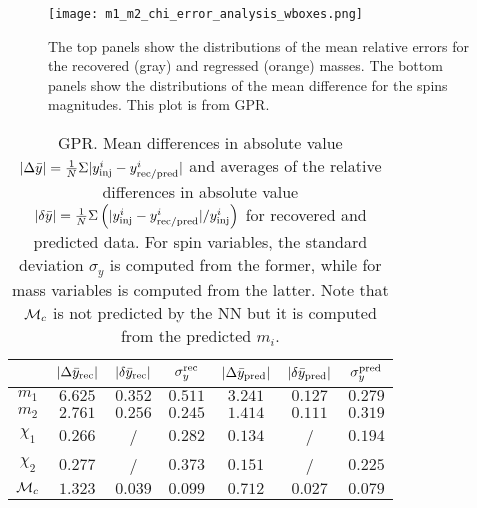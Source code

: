 \begin{figure}
    \centering
    \texttt{[image: m1\_m2\_chi\_error\_analysis\_wboxes.png]}
    \caption{The top panels show the distributions of the mean relative errors
            for the recovered (gray) and regressed (orange) masses. The bottom
            panels show the distributions of the mean difference for the spins
            magnitudes. This plot is from GPR.
            }
        \label{m_chi_comparisons}
\end{figure}


\begin{table}
  \caption{\label{GPR_errors}  GPR. Mean differences in absolute value
    $|\Delta \bar{y}|=  \frac{1}{N} \Sigma |y^i_{\rm inj} - y^i_{\rm rec/pred}|$
    and averages of the relative differences in absolute value
    $|\delta \bar{y}| = \frac{1}{N} \Sigma \left( |y^i_{\rm inj} -
    y^i_{\rm rec/pred}|/y^i_{\rm inj} \right) $ for recovered and predicted data.
    For spin variables, the standard deviation $\sigma_y$ is computed from the
    former, while for mass variables is computed from the latter. Note that
    ${\cal{M}}_c$ is not predicted by the NN but it is computed from the
    predicted $m_i$.}
  \begin{center}
  \begin{tabular}{c|ccc|ccc}
  \hline\hline
  & $|\Delta \bar{y}_{\rm rec}|$  & $|\delta \bar{y}_{\rm rec}|$  & $\sigma_y^{\rm rec}$ &
     $|\Delta \bar{y}_{\rm pred}|$ & $|\delta \bar{y}_{\rm pred}|$ & $\sigma_y^{\rm pred}$ \\
  \hline\hline
$m_1$          & $6.625$ & $0.352$ & $0.511$ & $3.241$ & $0.127$ & $0.279$ \\
$m_2$          & $2.761$ & $0.256$ & $0.245$ & $1.414$ & $0.111$ & $0.319$ \\
$\chi_1$       & $0.266$ &  /  & $0.282$ & $0.134$ &  /  & $0.194$ \\
$\chi_2$       & $0.277$ &  /  & $0.373$ & $0.151$ &  /  & $0.225$ \\
\hline
${\cal{M}}_c$  & $1.323$ & $0.039$ & $0.099$ & $0.712$ & $0.027$ & $0.079$ \\
  \hline\hline
  \end{tabular}
  \end{center}
\end{table}

